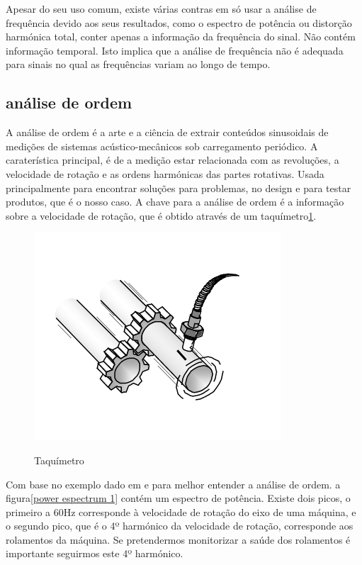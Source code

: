 Apesar do seu uso comum, existe várias contras em só usar a análise de frequência devido aos seus resultados, como o espectro de potência ou distorção harmónica total, conter apenas a informação da frequência do sinal. Não contém informação temporal. Isto implica que a análise de frequência não é adequada para sinais no qual as frequências variam ao longo de tempo.
\subsection{análise de ordem}
A análise de ordem é a arte e a ciência de extrair conteúdos sinusoidais de medições de sistemas acústico-mecânicos sob carregamento periódico. A caraterística principal, é de a medição estar relacionada com as revoluções, a velocidade de rotação e as ordens harmónicas das partes rotativas. Usada principalmente para encontrar soluções para problemas, no design e para testar produtos, que é o nosso caso. A chave para a análise de ordem é a informação sobre a velocidade de rotação, que é obtido através de um taquímetro\ref{taquimetro}.

\begin{figure}[H]
\centering
\includegraphics[scale=0.5]{figs/tacho_signal}
\caption{Taquímetro}\cite{orderAnalysis}\label{taquimetro}
\end{figure}

Com base no exemplo dado em \textcite{orderAnalysis2} e para melhor entender a análise de ordem. a figura\ref{power espectrum 1}  contém um espectro de potência. Existe dois picos, o primeiro a 60Hz corresponde à velocidade de rotação do eixo de uma máquina, e o  segundo pico, que é o 4º harmónico da velocidade de rotação, corresponde aos rolamentos da máquina. Se pretendermos monitorizar a saúde dos rolamentos é importante seguirmos este 4º harmónico.

